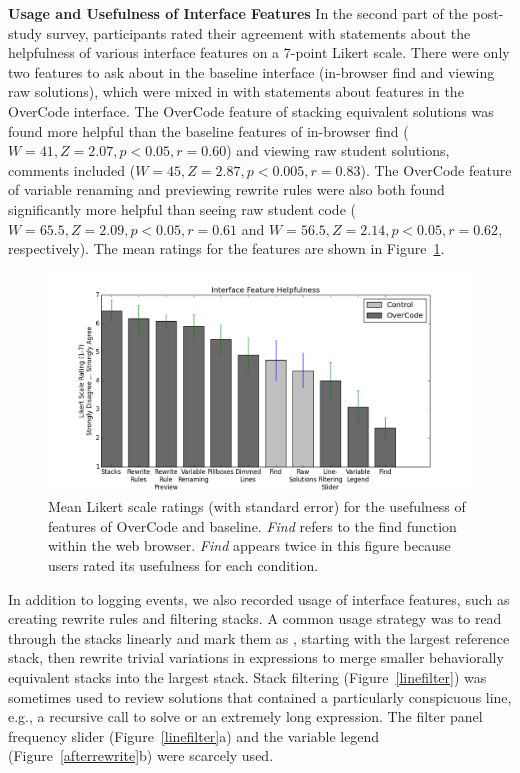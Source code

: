 {\bf Usage and Usefulness of Interface Features} In the second part of the post-study survey, participants rated their agreement with statements about the helpfulness of various interface features on a 7-point Likert scale. There were only two features to ask about in the baseline interface (in-browser find and viewing raw solutions), which were mixed in with statements about features in the OverCode interface. The OverCode feature of stacking equivalent solutions was found more helpful than the baseline features of in-browser find ($W=41, Z=2.07, p<0.05, r=0.60$) and viewing raw student solutions, comments included ($W=45, Z=2.87, p<0.005, r=0.83$). The OverCode feature of variable renaming and previewing rewrite rules were also both found significantly more helpful than seeing raw student code ($W=65.5, Z=2.09, p<0.05, r=0.61$ and $W=56.5, Z=2.14, p<0.05, r=0.62$, respectively). The mean ratings for the features are shown in Figure~\ref{featureHelpfulness}.

\begin{figure}
\centering
\includegraphics[scale=0.5]{Body/figures/overcode/featureHelpfulness.png}
\caption{Mean Likert scale ratings (with standard error) for the usefulness of features of OverCode and baseline. {\it Find} refers to the find function within the web browser. {\it Find} appears twice in this figure because users rated its usefulness for each condition.}
\label{featureHelpfulness}
\end{figure}

In addition to logging  events, we also recorded usage of interface features, such as creating rewrite rules and filtering stacks. A common usage strategy was to read through the stacks linearly and mark them as , starting with the largest reference stack, then rewrite trivial variations in expressions to merge smaller behaviorally equivalent stacks into the largest stack. Stack filtering (Figure~\ref{linefilter}) was sometimes used to review solutions that contained a particularly conspicuous line, e.g., a recursive call to solve  or an extremely long expression. The filter panel frequency slider (Figure~\ref{linefilter}a) and the variable legend (Figure~\ref{afterrewrite}b) were scarcely used.

